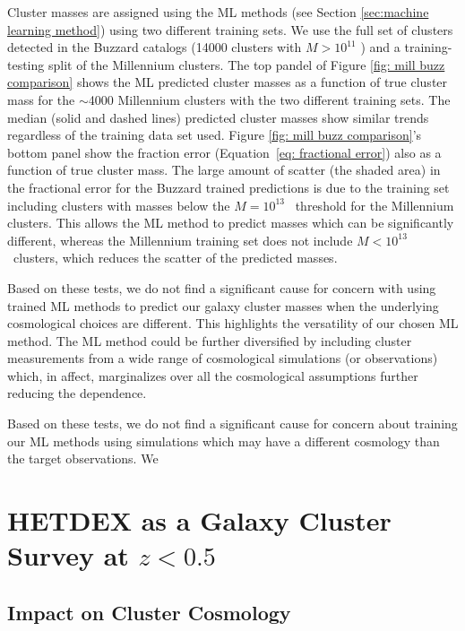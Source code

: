 \documentclass[fleqn,usenatbib]{mnras}
\begin{document}
Cluster masses are assigned using the ML methods (see Section \ref{sec:machine learning method}) using two different training sets. We use the full set of clusters detected in the Buzzard catalogs (14000 clusters with $M > 10^{11}$ \msol) and a training-testing split of the Millennium clusters. The top pandel of Figure \ref{fig: mill buzz comparison} shows the ML predicted cluster masses as a function of true cluster mass for the $\sim$4000 Millennium clusters with the two different training sets. The median (solid and dashed lines) predicted cluster masses show similar trends regardless of the training data set used. Figure \ref{fig: mill buzz comparison}'s bottom panel show the fraction error (Equation~\ref{eq: fractional error}) also as a function of true cluster mass. The large amount of scatter (the shaded area) in the fractional error for the Buzzard trained predictions is due to the training set including clusters with masses below the $M = 10^{13}$ \Msol\ threshold for the Millennium clusters. This allows the ML method to predict masses which can be significantly different, whereas the Millennium training set does not include $M < 10^{13}$ \Msol\ clusters, which reduces the scatter of the predicted masses.

Based on these tests, we do not find a significant cause for concern with using trained ML methods to predict our galaxy cluster masses when the underlying cosmological choices are different. This highlights the versatility of our chosen ML method. The ML method could be further diversified by including cluster measurements from a wide range of cosmological simulations (or observations) which, in affect, marginalizes over all the cosmological assumptions further reducing the dependence.

Based on these tests, we do not find a significant cause for concern about training our ML methods using simulations which may have a different cosmology than the target observations. We 
 
\section{HETDEX as a Galaxy Cluster Survey at $z < 0.5$}\label{sec:discussion}

\subsection{Impact on Cluster Cosmology}
\end{document}

